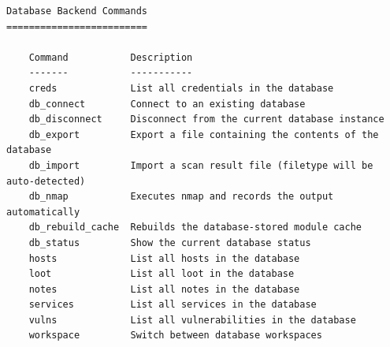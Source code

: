 \documentclass[10pt,a4paper]{report}
\begin{document}
\begin{verbatim}
Database Backend Commands
=========================

    Command           Description
    -------           -----------
    creds             List all credentials in the database
    db_connect        Connect to an existing database
    db_disconnect     Disconnect from the current database instance
    db_export         Export a file containing the contents of the database
    db_import         Import a scan result file (filetype will be auto-detected)
    db_nmap           Executes nmap and records the output automatically
    db_rebuild_cache  Rebuilds the database-stored module cache
    db_status         Show the current database status
    hosts             List all hosts in the database
    loot              List all loot in the database
    notes             List all notes in the database
    services          List all services in the database
    vulns             List all vulnerabilities in the database
    workspace         Switch between database workspaces
\end{verbatim}
\end{document}
